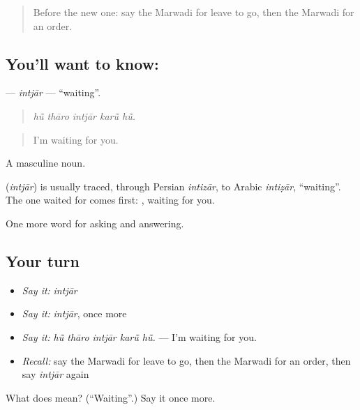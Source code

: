\begin{quote}
Before the new one: say the Marwadi for leave to go, then the Marwadi for an order.
\end{quote}

\subsection*{You'll want to know: }
\textbf{} — \emph{intjār} — \textquotedblleft{}waiting\textquotedblright{}.

\begin{quote}
    
\end{quote}

\begin{quote}
\emph{hū̃ thāro intjār karū̃ hū̃.}
\end{quote}

\begin{quote}
I'm waiting for you.
\end{quote}

A masculine noun.

\begin{cousinweb}
\textbf{} (\emph{intjār}) is usually traced, through Persian \emph{intizār}, to Arabic \emph{intiẓār}, \textquotedblleft{}waiting\textquotedblright{}. The one waited for comes first: \textbf{ }, waiting for you.
\end{cousinweb}

\begin{grammarlens}[title={What you've built}]
One more word for asking and answering.
\end{grammarlens}

\subsection*{Your turn}
\begin{itemize}
\raggedright
  \item \emph{Say it:} \emph{intjār}
  \item \emph{Say it:} \emph{intjār}, once more
  \item \emph{Say it:} \emph{hū̃ thāro intjār karū̃ hū̃.} — I'm waiting for you.
  \item \emph{Recall:} say the Marwadi for leave to go, then the Marwadi for an order, then say \emph{intjār} again
\end{itemize}

\begin{tcolorbox}[breakable,colback=teal!4,colframe=teal!35!black,title={Before you move on}]
What does  mean? (\textquotedblleft{}Waiting\textquotedblright{}.) Say it once more.
\end{tcolorbox}
